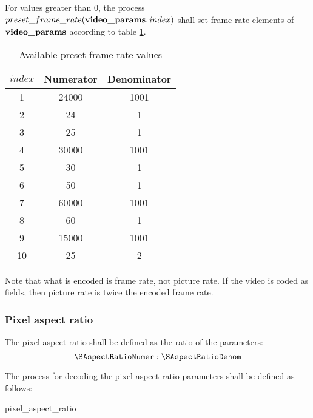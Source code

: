 For values greater than $0$, the process $preset\_frame\_rate(\textbf{video\_params},index)$ 
shall set frame rate elements of $\textbf{video\_params}$ according to table \ref{table:frameratevalues}.

\begin{table}[!ht]
\centering
\begin{tabular}{|c|c|c|}
\hline
\rowcolor[gray]{0.75}$index$ & Numerator & Denominator \\
\hline
1 & 24000 & 1001 \\
\hline
2 & 24 & 1 \\
\hline
3 & 25 & 1 \\
\hline
4 & 30000 & 1001 \\
\hline
5 & 30 & 1 \\
\hline
6 & 50 & 1 \\
\hline
7 & 60000 & 1001 \\
\hline
8 & 60 & 1 \\
\hline
9 & 15000 & 1001 \\
\hline
10 & 25 & 2 \\
\hline
\end{tabular}
\caption{Available preset frame rate values}\label{table:frameratevalues}
\end{table}

\begin{informative}
Note that what is encoded is frame rate, not picture rate. If the video is coded
as fields, then picture rate is twice the encoded frame rate.
\end{informative}

\subsubsection{Pixel aspect ratio}
\label{aspectratio}

The pixel aspect ratio shall be defined as the ratio of the parameters:
		\[\SAspectRatioNumer : \SAspectRatioDenom\]

The process for decoding the pixel aspect ratio parameters shall be defined as follows:

\begin{pseudo}{pixel\_aspect\_ratio}{\VideoParams}
    \bsELSE
    \bsEND
\bsEND
\end{pseudo}

